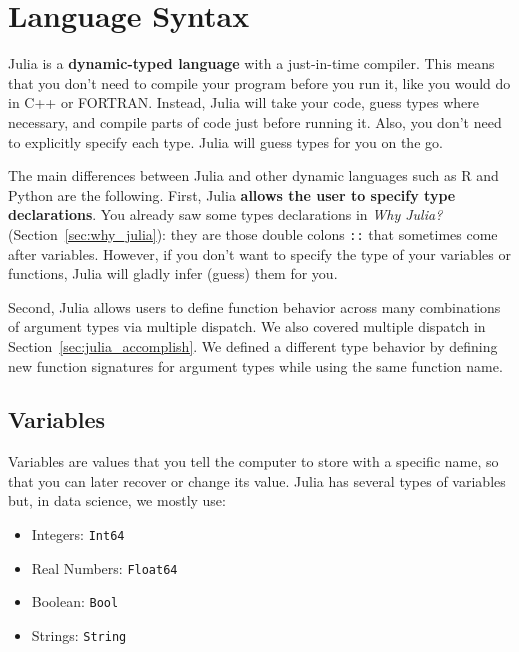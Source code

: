\documentclass[
  notoc %
]{tufte-book}
\providecommand{\tightlist}{%
  \setlength{\itemsep}{0pt}\setlength{\parskip}{0pt}
}
\newcommand{\passthrough}[1]{#1}
\begin{document}
\hypertarget{sec:syntax}{%
\section{Language Syntax}\label{sec:syntax}}

Julia is a \textbf{dynamic-typed language} with a just-in-time compiler.
This means that you don't need to compile your program before you run
it, like you would do in C++ or FORTRAN. Instead, Julia will take your
code, guess types where necessary, and compile parts of code just before
running it. Also, you don't need to explicitly specify each type. Julia
will guess types for you on the go.

The main differences between Julia and other dynamic languages such as R
and Python are the following. First, Julia \textbf{allows the user to
specify type declarations}. You already saw some types declarations in
\emph{Why Julia?} (Section~\ref{sec:why_julia}): they are those double
colons \passthrough{\lstinline!::!} that sometimes come after variables.
However, if you don't want to specify the type of your variables or
functions, Julia will gladly infer (guess) them for you.

Second, Julia allows users to define function behavior across many
combinations of argument types via multiple dispatch. We also covered
multiple dispatch in Section~\ref{sec:julia_accomplish}. We defined a
different type behavior by defining new function signatures for argument
types while using the same function name.

\hypertarget{sec:variable}{%
\subsection{Variables}\label{sec:variable}}

Variables are values that you tell the computer to store with a specific
name, so that you can later recover or change its value. Julia has
several types of variables but, in data science, we mostly use:

\begin{itemize}
\tightlist
\item
  Integers: \passthrough{\lstinline!Int64!}
\item
  Real Numbers: \passthrough{\lstinline!Float64!}
\item
  Boolean: \passthrough{\lstinline!Bool!}
\item
  Strings: \passthrough{\lstinline!String!}
\end{itemize}
\end{document}
